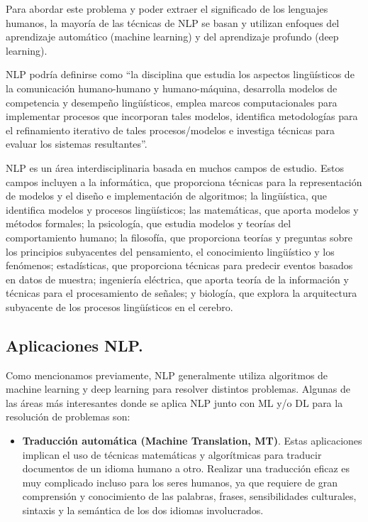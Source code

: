 \documentclass[12pt,a4paper]{article}
\begin{document}
\begin{sloppypar}
Para abordar este problema y poder extraer el significado de los lenguajes humanos, la mayoría de las técnicas de NLP se basan y utilizan enfoques del aprendizaje automático (machine learning) y del aprendizaje profundo (deep learning)\cite{NLP_1, NLP_2}.

NLP podría definirse como ``la disciplina que estudia los aspectos lingüísticos de la comunicación humano-humano y humano-máquina, desarrolla modelos de competencia y desempeño lingüísticos, emplea marcos computacionales para implementar procesos que incorporan tales modelos, identifica metodologías para el refinamiento iterativo de tales procesos/modelos e investiga técnicas para evaluar los sistemas resultantes''\cite{NLP_3_4}.

NLP es un área interdisciplinaria basada en muchos campos de estudio. Estos campos incluyen a la informática, que proporciona técnicas para la representación de modelos y el diseño e implementación de algoritmos; la lingüística, que identifica modelos y procesos lingüísticos; las matemáticas, que aporta modelos y métodos formales; la psicología, que estudia modelos y teorías del comportamiento humano; la filosofía, que proporciona teorías y preguntas sobre los principios subyacentes del pensamiento, el conocimiento lingüístico y los fenómenos; estadísticas, que proporciona técnicas para predecir eventos basados en datos de muestra; ingeniería eléctrica, que aporta teoría de la información y técnicas para el procesamiento de señales; y biología, que explora la arquitectura subyacente de los procesos lingüísticos en el cerebro\cite{NLP_3_4}.

\cleardoublepage

\subsection{Aplicaciones NLP.}\label{Aplicaciones_NLP}

Como mencionamos previamente, NLP generalmente utiliza algoritmos de machine learning y deep learning para resolver distintos problemas. Algunas de las áreas más interesantes donde se aplica NLP junto con ML y/o DL para la resolución de problemas son\cite{NLP_5, NLP_6}:

\begin{itemize}
\item \textbf{Traducción automática (Machine Translation, MT)}. Estas aplicaciones implican el uso de técnicas matemáticas y algorítmicas para traducir documentos de un idioma humano a otro. Realizar una traducción eficaz es muy complicado incluso para los seres humanos, ya que requiere de gran comprensión y conocimiento de las palabras, frases, sensibilidades culturales, sintaxis y la semántica de los dos idiomas involucrados. 


\end{itemize}
\end{sloppypar}
\end{document}

